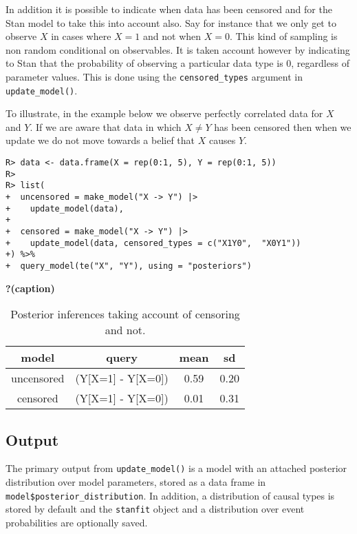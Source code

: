 \documentclass[
  11pt,
  article]{jss}
\begin{document}
In addition it is possible to indicate when data has been censored and
for the Stan model to take this into account also. Say for instance that
we only get to observe \(X\) in cases where \(X=1\) and not when
\(X=0\). This kind of sampling is non random conditional on observables.
It is taken account however by indicating to Stan that the probability
of observing a particular data type is 0, regardless of parameter
values. This is done using the \texttt{censored\_types} argument in
\texttt{update\_model()}.

To illustrate, in the example below we observe perfectly correlated data
for \(X\) and \(Y\). If we are aware that data in which \(X \neq Y\) has
been censored then when we update we do not move towards a belief that
\(X\) causes \(Y\).

\begin{verbatim}
R> data <- data.frame(X = rep(0:1, 5), Y = rep(0:1, 5))
R> 
R> list(
+  uncensored = make_model("X -> Y") |>
+    update_model(data),
+  
+  censored = make_model("X -> Y") |>
+    update_model(data, censored_types = c("X1Y0",  "X0Y1"))
+) %>%
+  query_model(te("X", "Y"), using = "posteriors") 
\end{verbatim}

\begin{table}

\caption{\textbf{?(caption)}}

\end{table}

\hypertarget{tbl-censored}{}
\begin{table}
\caption{\label{tbl-censored}Posterior inferences taking account of censoring and not. }\tabularnewline

\centering
\begin{tabular}{cccc}
\toprule
model & query & mean & sd\\
\midrule
uncensored & (Y[X=1] - Y[X=0]) & 0.59 & 0.20\\
censored & (Y[X=1] - Y[X=0]) & 0.01 & 0.31\\
\bottomrule
\end{tabular}
\end{table}

\hypertarget{output}{%
\subsection{Output}\label{output}}

The primary output from \texttt{update\_model()} is a model with an
attached posterior distribution over model parameters, stored as a data
frame in \texttt{model\$posterior\_distribution}. In addition, a
distribution of causal types is stored by default and the
\texttt{stanfit} object and a distribution over event probabilities are
optionally saved.
\end{document}
